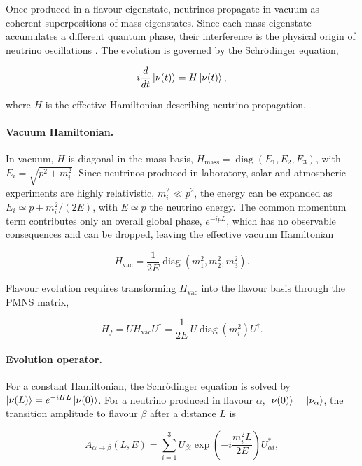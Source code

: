 Once produced in a flavour eigenstate, neutrinos propagate in vacuum as coherent superpositions of mass eigenstates. Since each mass eigenstate accumulates a different quantum phase, their interference is the physical origin of neutrino oscillations \parencite{Giunti2007}. The evolution is governed by the Schr\"odinger equation,

\begin{equation}
  i\frac{d}{dt}\left|\nu(t)\right\rangle = H\left|\nu(t)\right\rangle,
\end{equation}

where \(H\) is the effective Hamiltonian describing neutrino propagation.

\paragraph{Vacuum Hamiltonian.}
In vacuum, \(H\) is diagonal in the mass basis, \(H_{\mathrm{mass}}=\operatorname{diag}(E_1,E_2,E_3)\), with \(E_i=\sqrt{p^2+m_i^2}\). Since neutrinos produced in laboratory, solar and atmospheric experiments are highly relativistic, \(m_i^2\ll p^2\), the energy can be expanded as \(E_i\simeq p + m_i^2/(2E)\), with \(E\simeq p\) the neutrino energy. The common momentum term contributes only an overall global phase, \(e^{-ipL}\), which has no observable consequences and can be dropped, leaving the effective vacuum Hamiltonian

\begin{equation}
  H_{\mathrm{vac}} = \frac{1}{2E}\operatorname{diag}\left(m_1^2,m_2^2,m_3^2\right).
\end{equation}

Flavour evolution requires transforming \(H_{\mathrm{vac}}\) into the flavour basis through the PMNS matrix,

\begin{equation}
  H_{f} = U H_{\mathrm{vac}} U^{\dagger} = \frac{1}{2E}\,U\operatorname{diag}(m_i^2)U^{\dagger}.
\end{equation}

\paragraph{Evolution operator.}
For a constant Hamiltonian, the Schr\"odinger equation is solved by \(\left|\nu(L)\right\rangle=e^{-iHL}\left|\nu(0)\right\rangle\). For a neutrino produced in flavour \(\alpha\), \(\left|\nu(0)\right\rangle=\left|\nu_\alpha\right\rangle\), the transition amplitude to flavour \(\beta\) after a distance \(L\) is

\begin{equation}
  A_{\alpha\to\beta}(L,E) =
  \sum_{i=1}^{3} U_{\beta i}
  \exp\left(-i\frac{m_i^2 L}{2E}\right)
  U_{\alpha i}^{*},
  \label{eq:vacuum-transition-amplitude}
\end{equation}

